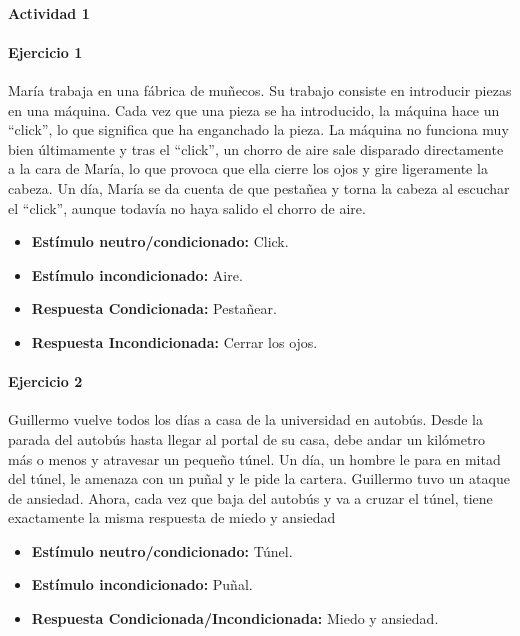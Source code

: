 \documentclass[palatino,nochap]{apuntesURJC}
\begin{document}
\begin{example}
\paragraph{Actividad 1}

\paragraph{Ejercicio 1}
María trabaja en una fábrica de muñecos. Su trabajo consiste en introducir piezas en
una máquina. Cada vez que una pieza se ha introducido, la máquina hace un “click”,
lo que significa que ha enganchado la pieza. La máquina no funciona muy bien
últimamente y tras el “click”, un chorro de aire sale disparado directamente a la cara
de María, lo que provoca que ella cierre los ojos y gire ligeramente la cabeza.
Un día, María se da cuenta de que pestañea y torna la cabeza al escuchar el “click”,
aunque todavía no haya salido el chorro de aire.

\begin{itemize}
\item \textbf{Estímulo neutro/condicionado:} Click.
\item \textbf{Estímulo incondicionado:} Aire.
\item \textbf{Respuesta Condicionada:} Pestañear.
\item \textbf{Respuesta Incondicionada:} Cerrar los ojos.
\end{itemize}

\paragraph{Ejercicio 2}

Guillermo vuelve todos los días a casa de la universidad en autobús. Desde la
parada del autobús hasta llegar al portal de su casa, debe andar un kilómetro más o
menos y atravesar un pequeño túnel. Un día, un hombre le para en mitad del túnel,
le amenaza con un puñal y le pide la cartera. Guillermo tuvo un ataque de ansiedad.
Ahora, cada vez que baja del autobús y va a cruzar el túnel, tiene exactamente la
misma respuesta de miedo y ansiedad

\begin{itemize}
\item \textbf{Estímulo neutro/condicionado:} Túnel.
\item \textbf{Estímulo incondicionado:} Puñal.
\item \textbf{Respuesta Condicionada/Incondicionada:} Miedo y ansiedad.
\end{itemize}



\end{example}
\end{document}
